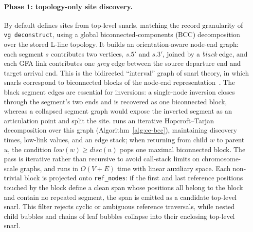 \paragraph{Phase 1: topology-only site discovery.}
By default \gfaz defines sites from top-level snarls, matching the record
granularity of \texttt{vg deconstruct}, using a global biconnected-components (BCC)
decomposition over the stored L-line topology. It builds an orientation-aware
node-end graph: each segment $s$ contributes two vertices, $s.5'$ and $s.3'$, joined
by a \emph{black} edge, and each GFA link contributes one \emph{grey} edge between
the source departure end and target arrival end. This is the bidirected
``interval'' graph of snarl theory, in which snarls correspond to biconnected blocks
of the node-end representation~\cite{paten2018superbubbles}. The black segment edges
are essential for inversions: a single-node inversion closes through the segment's
two ends and is recovered as one biconnected block, whereas a collapsed segment
graph would expose the inverted segment as an articulation point and split the site.
\gfaz runs an iterative Hopcroft--Tarjan decomposition over this graph
(Algorithm~\ref{alg:ce-bcc}), maintaining discovery times, low-link values, and an
edge stack; when returning from child $w$ to parent $u$, the condition
$\textit{low}(w)\ge\textit{disc}(u)$ pops one maximal biconnected block. The pass is
iterative rather than recursive to avoid call-stack limits on chromosome-scale
graphs, and runs in $O(V+E)$ time with linear auxiliary space. Each non-trivial
block is projected onto \texttt{ref\_nodes}: if the first and last reference
positions touched by the block define a clean span whose positions all belong to the
block and contain no repeated segment, the span is emitted as a candidate top-level
snarl. This filter rejects cyclic or ambiguous reference traversals, while nested
child bubbles and chains of leaf bubbles collapse into their enclosing top-level
snarl.

